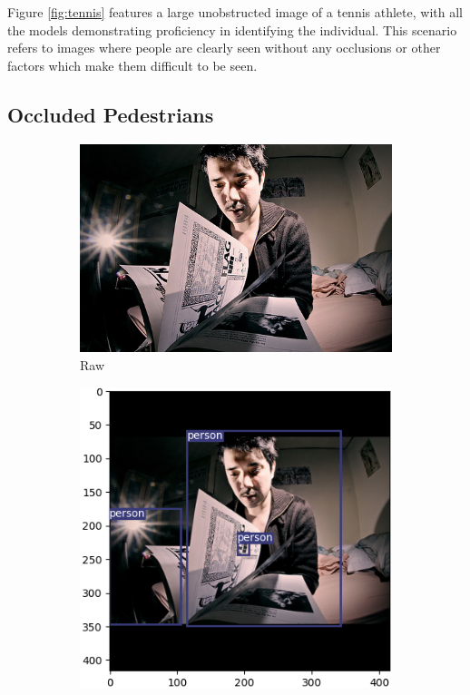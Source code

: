 Figure \ref{fig:tennis} features a large unobstructed image of a tennis athlete, with all the models demonstrating proficiency in identifying the individual. This scenario refers to images where people are clearly seen without any occlusions or other factors which make them difficult to be seen.

\subsection{Occluded Pedestrians}
\begin{figure}[!htbp]
\centering
\begin{subfigure}{.2\textwidth}
  \centering
  \includegraphics[width=\textwidth]{images/newspaper.jpg}
  \caption{Raw}
  \label{fig:ognews}
\end{subfigure}%
\begin{subfigure}{.2\textwidth}
  \centering
  \includegraphics[width=\textwidth]{images/base_newspaper.png}

\end{subfigure}
\end{figure}
